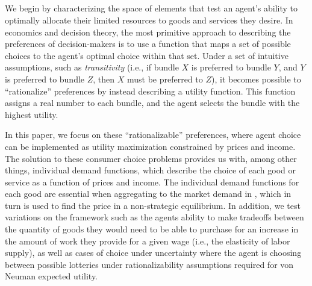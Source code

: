 


\subsection{\fifthParent}\label{setting:fifth}

We begin by characterizing the space of elements that test an agent's ability to optimally allocate their limited resources to goods and services they desire.  In economics and decision theory, the most primitive approach to describing the preferences of decision-makers is to use a function that maps a set of possible choices to the agent's optimal choice within that set.  Under a set of intuitive assumptions, such as \textit{transitivity} (i.e., if bundle $X$ is preferred to bundle $Y$, and $Y$ is preferred to bundle $Z$, then $X$ must be preferred to $Z$), it becomes possible to ``rationalize'' preferences by instead describing a utility function. This function assigns a real number to each bundle, and the agent selects the bundle with the highest utility.  %

In this paper, we focus on these ``rationalizable'' preferences, where agent choice can be implemented as utility maximization constrained by prices and income. The solution to these consumer choice problems provides us with, among other things, individual demand functions, which describe the choice of each good or service as a function of prices and income. The individual demand functions for each good are essential when aggregating to the market demand in , which in turn is used to find the price in a non-strategic equilibrium.  In addition, we test variations on the framework such as the agents ability to make tradeoffs between the quantity of goods they would need to be able to purchase for an increase in the amount of work they provide for a given wage (i.e., the elasticity of labor supply), as well as cases of choice under uncertainty where the agent is choosing between possible lotteries under rationalizability assumptions required for von Neuman expected utility.


